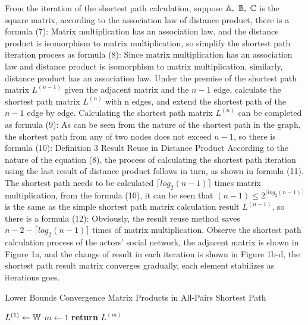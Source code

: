 \documentclass[review]{cvpr}
\begin{document}
From the iteration of the shortest path calculation, suppose \(\Bbb A,\ \Bbb B,\ \Bbb C\) is the square matrix, according to the association law of distance product, there is a formula (7):
Matrix multiplication has an association law, and the distance product is isomorphism to matrix multiplication, so simplify the shortest path iteration process as formula (8):
Since matrix multiplication has an association law and distance product is isomorphism to matrix multiplication, similarly, distance product has an association law.
Under the premise of the shortest path matrix $L^{(n-1)}$ given the adjacent matrix and the $n-1$ edge, calculate the shortest path matrix $L^{(n)}$ with n edges, and extend the shortest path of the $n-1$ edge by edge.
Calculating the shortest path matrix $L^{(n)}$ can be completed as formula (9):
As can be seen from the nature of the shortest path in the graph, the shortest path from any of two nodes does not exceed $n-1$, so there is formula (10):
Definition 3 Result Reuse in Distance Product According to the nature of the equation (8), the process of calculating the shortest path iteration using the last result of distance product follows in turn, as shown in formula (11).
The shortest path needs to be calculated $\lceil{log_2(n-1)}\rceil$ times matrix multiplication, from the formula (10), it can be seen that $(n-1)\leq2^{\lceil{log_2(n-1)}\rceil}$ is the same as the simple shortest path matrix calculation result $L^{(n-1)}$, so there is a formula (12):
Obviously, the result reuse method saves $n-2-\lceil{log_2(n-1)}\rceil$ times of matrix multiplication.
Observe the shortest path calculation process of the actors' social network, the adjacent matrix is shown in Figure 1a, and the change of result in each iteration is shown in Figure 1b-d, the shortest path result matrix converges gradually, each element stabilizes as iterations goes.


\begin{algorithm}
\caption{Lower Bounds Convergence Matrix Products in All-Pairs Shortest Path}\label{algorithm}
  $L^{(1)}\leftarrow \Bbb W$\;
  $m\leftarrow 1$\;
  {\bf return} $L^{(m)}$\;
\end{algorithm}
\end{document}
